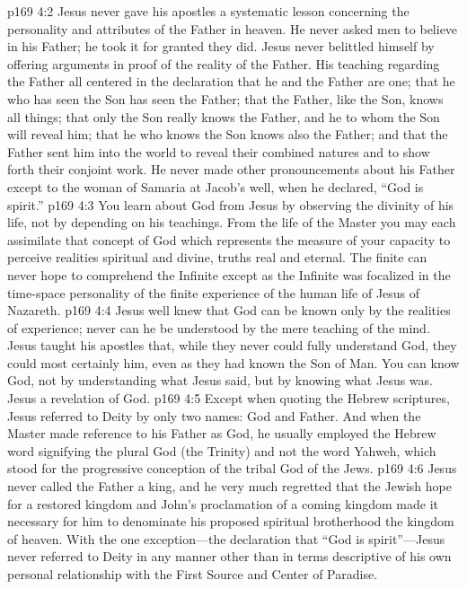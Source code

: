 \vs p169 4:2 Jesus never gave his apostles a systematic lesson concerning the personality and attributes of the Father in heaven. He never asked men to believe in his Father; he took it for granted they did. Jesus never belittled himself by offering arguments in proof of the reality of the Father. His teaching regarding the Father all centered in the declaration that he and the Father are one; that he who has seen the Son has seen the Father; that the Father, like the Son, knows all things; that only the Son really knows the Father, and he to whom the Son will reveal him; that he who knows the Son knows also the Father; and that the Father sent him into the world to reveal their combined natures and to show forth their conjoint work. He never made other pronouncements about his Father except to the woman of Samaria at Jacob’s well, when he declared, \textcolor{ubdarkred}{“God is spirit.”}
\pc \vs p169 4:3 You learn about God from Jesus by observing the divinity of his life, not by depending on his teachings. From the life of the Master you may each assimilate that concept of God which represents the measure of your capacity to perceive realities spiritual and divine, truths real and eternal. The finite can never hope to comprehend the Infinite except as the Infinite was focalized in the time\hyp{}space personality of the finite experience of the human life of Jesus of Nazareth.
\vs p169 4:4 Jesus well knew that God can be known only by the realities of experience; never can he be understood by the mere teaching of the mind. Jesus taught his apostles that, while they never could fully understand God, they could most certainly  him, even as they had known the Son of Man. You can know God, not by understanding what Jesus said, but by knowing what Jesus was. Jesus  a revelation of God.
\pc \vs p169 4:5 Except when quoting the Hebrew scriptures, Jesus referred to Deity by only two names: God and Father. And when the Master made reference to his Father as God, he usually employed the Hebrew word signifying the plural God (the Trinity) and not the word Yahweh, which stood for the progressive conception of the tribal God of the Jews.
\vs p169 4:6 Jesus never called the Father a king, and he very much regretted that the Jewish hope for a restored kingdom and John’s proclamation of a coming kingdom made it necessary for him to denominate his proposed spiritual brotherhood the kingdom of heaven. With the one exception---the declaration that \textcolor{ubdarkred}{“God is spirit”}---Jesus never referred to Deity in any manner other than in terms descriptive of his own personal relationship with the First Source and Center of Paradise.
